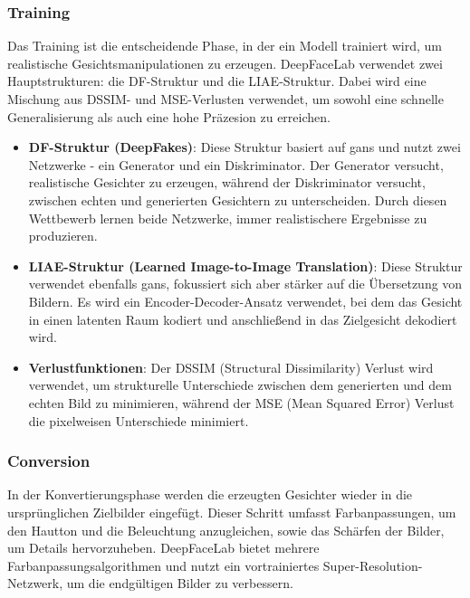 \subsubsection{Training}
Das Training ist die entscheidende Phase, in der ein Modell trainiert wird, um realistische Gesichtsmanipulationen zu erzeugen.
DeepFaceLab verwendet zwei Hauptstrukturen: die DF-Struktur und die LIAE-Struktur.
Dabei wird eine Mischung aus DSSIM- und MSE-Verlusten verwendet, um sowohl eine schnelle Generalisierung als auch eine hohe Präzesion zu erreichen\cite{deepfacelabintegratedflexibleextensible, deepfacelab}.

\begin{itemize}
    \item \textbf{DF-Struktur (DeepFakes)}: Diese Struktur basiert auf \glspl{gan} und nutzt zwei Netzwerke - ein Generator und ein Diskriminator. 
    Der Generator versucht, realistische Gesichter zu erzeugen, während der Diskriminator versucht, zwischen echten und generierten Gesichtern zu unterscheiden.
    Durch diesen Wettbewerb lernen beide Netzwerke, immer realistischere Ergebnisse zu produzieren.
    \item \textbf{LIAE-Struktur (Learned Image-to-Image Translation)}: Diese Struktur verwendet ebenfalls \glspl{gan}, fokussiert sich aber stärker auf die Übersetzung von Bildern. 
     Es wird ein Encoder-Decoder-Ansatz verwendet, bei dem das Gesicht in einen latenten Raum kodiert und anschließend in das Zielgesicht dekodiert wird.
    \item \textbf{Verlustfunktionen}: Der DSSIM (Structural Dissimilarity) Verlust wird verwendet, um strukturelle Unterschiede zwischen dem generierten und dem echten Bild zu minimieren, während der MSE (Mean Squared Error) Verlust die pixelweisen Unterschiede minimiert.
\end{itemize}

\subsubsection{Conversion}
In der Konvertierungsphase werden die erzeugten Gesichter wieder in die ursprünglichen Zielbilder eingefügt.
Dieser Schritt umfasst Farbanpassungen, um den Hautton und die Beleuchtung anzugleichen, sowie das Schärfen der Bilder, um Details hervorzuheben.
DeepFaceLab bietet mehrere Farbanpassungsalgorithmen und nutzt ein vortrainiertes Super-Resolution-Netzwerk, um die endgültigen Bilder zu verbessern\cite{deepfacelabintegratedflexibleextensible, deepfacelab}.

